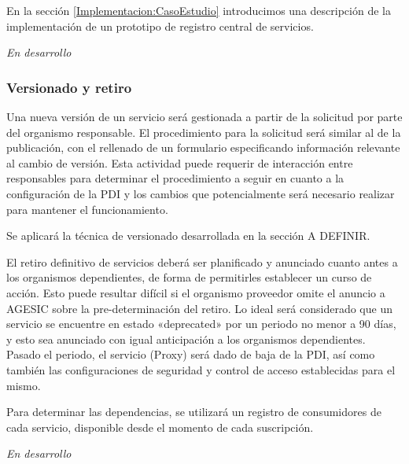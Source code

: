       En la sección \ref{Implementacion:CasoEstudio} introducimos una descripción de la implementación de un prototipo de registro central de servicios.

      \emph{En desarrollo}

    \subsubsection{Versionado y retiro}
      Una nueva versión de un servicio será gestionada a partir de la solicitud por parte del organismo responsable. El procedimiento para la solicitud será similar al de la publicación, con el rellenado de un formulario especificando información relevante al cambio de versión. Esta actividad puede requerir de interacción entre responsables para determinar el procedimiento a seguir en cuanto a la configuración de la PDI y los cambios que potencialmente será necesario realizar para mantener el funcionamiento.

      Se aplicará la técnica de versionado desarrollada en la sección A DEFINIR.

      El retiro definitivo de servicios deberá ser planificado y anunciado cuanto antes a los organismos dependientes, de forma de permitirles establecer un curso de acción. Esto puede resultar difícil si el organismo proveedor omite el anuncio a AGESIC sobre la pre-determinación del retiro. Lo ideal será considerado que un servicio se encuentre en estado «deprecated» por un periodo no menor a 90 días, y esto sea anunciado con igual anticipación a los organismos dependientes. Pasado el periodo, el servicio (Proxy) será dado de baja de la PDI, así como también las configuraciones de seguridad y control de acceso establecidas para el mismo.

      Para determinar las dependencias, se utilizará un registro de consumidores de cada servicio, disponible desde el momento de cada suscripción.

      \emph{En desarrollo}
